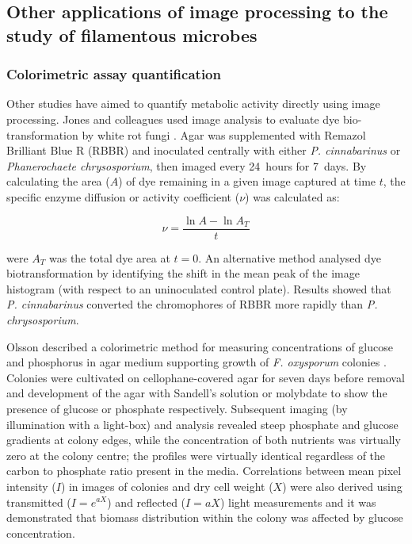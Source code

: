 \subsection{Other applications of image processing to the study of filamentous microbes}

\subsubsection{Colorimetric assay quantification}

Other studies have aimed to quantify metabolic activity directly using image processing. Jones and colleagues used image analysis to evaluate dye bio-transformation by white rot fungi \cite{jones1993b}. Agar was supplemented with Remazol Brilliant Blue R (RBBR) and inoculated centrally with either \emph{P. cinnabarinus} or \emph{Phanerochaete chrysosporium}, then imaged every 24~hours for 7~days. By calculating the area ($A$) of dye remaining in a given image captured at time $t$, the specific enzyme diffusion or activity coefficient ($\nu$) was calculated as:

\begin{equation}
	\nu = \frac{\ln A - \ln A_T}{t}
\end{equation}

\noindent were $A_T$ was the total dye area at $t = 0$. An alternative method analysed dye biotransformation by identifying the shift in the mean peak of the image histogram (with respect to an uninoculated control plate). Results showed that \emph{P. cinnabarinus} converted the chromophores of RBBR more rapidly than \emph{P. chrysosporium}.

Olsson described a colorimetric method for measuring concentrations of glucose and phosphorus in agar medium supporting growth of \emph{F. oxysporum} colonies \cite{olsson1994}. Colonies were cultivated on cellophane-covered agar for seven days before removal and development of the agar with Sandell's solution or molybdate to show the presence of glucose or phosphate respectively. Subsequent imaging (by illumination with a light-box) and analysis revealed steep phosphate and glucose gradients at colony edges, while the concentration of both nutrients was virtually zero at the colony centre; the profiles were virtually identical regardless of the carbon to phosphate ratio present in the media. Correlations between mean pixel intensity ($I$) in images of colonies and dry cell weight ($X$) were also derived using transmitted ($I = e^{aX}$) and reflected ($I = aX$) light measurements and it was demonstrated that biomass distribution within the colony was affected by glucose concentration.

